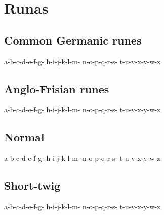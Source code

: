 
\newcommand{\SIG}[1]{{\par\nobreak
      \smallskip\hfill\footnotesize#1\par\medskip
  }}

\parskip0pt

\chapter{Runas}


\section{Common Germanic runes}

a-b-c-d-e-f-g-
h-i-j-k-l-m-
n-o-p-q-r-s-
t-u-v-x-y-w-z

\section{Anglo-Frisian runes}
a-b-c-d-e-f-g-
h-i-j-k-l-m-
n-o-p-q-r-s-
t-u-v-x-y-w-z

\section{Normal}
a-b-c-d-e-f-g-
h-i-j-k-l-m-
n-o-p-q-r-s-
t-u-v-x-y-w-z

\section{Short-twig}
a-b-c-d-e-f-g-
h-i-j-k-l-m-
n-o-p-q-r-s-
t-u-v-x-y-w-z

